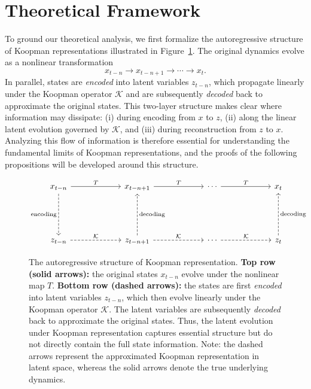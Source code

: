 \documentclass{article} %
\begin{document}
\section{Theoretical Framework} \label{append:theoretical_analysis}
To ground our theoretical analysis, we first formalize the autoregressive structure of Koopman representations illustrated in Figure~\ref{fig:latent_autoregressive_via_koopman}. The original dynamics evolve as a nonlinear transformation 
\[
x_{t-n} \to x_{t-n+1} \to \cdots \to x_t .
\] 
In parallel, states are \emph{encoded} into latent variables $z_{t-n}$, which propagate linearly under the Koopman operator $\mathcal{K}$ and are subsequently \emph{decoded} back to approximate the original states. This two-layer structure makes clear where information may dissipate: (i) during encoding from $x$ to $z$, (ii) along the linear latent evolution governed by $\mathcal{K}$, and (iii) during reconstruction from $z$ to $x$. Analyzing this flow of information is therefore essential for understanding the fundamental limits of Koopman representations, and the proofs of the following propositions will be developed around this structure.


\begin{figure}[h]
    \centering
    \[
    \begin{tikzcd}[row sep=5em, column sep=6em]
    x_{t-n} 
      \arrow[r, "T"] 
      \arrow[d, dashed, "\text{encoding}"'] 
      & x_{t-n+1} 
        \arrow[r, "T"] 
      & \cdots 
        \arrow[r, "T"] 
      & x_t 
    \\
    z_{t-n} 
      \arrow[r, dashed, "\mathcal{K}"] 
      & z_{t-n+1} 
        \arrow[r, dashed, "\mathcal{K}"] 
        \arrow[u, dashed, "\text{decoding}"'] 
      & \cdots 
        \arrow[r, dashed, "\mathcal{K}"]
      & z_t 
          \arrow[u, dashed, "\text{decoding}"'] 
    \end{tikzcd}
    \]
    \caption{
    The autoregressive structure of Koopman representation.
    \textbf{Top row (solid arrows):} the original states $x_{t-n}$ evolve under the nonlinear map $T$. 
    \textbf{Bottom row (dashed arrows):} the states are first \emph{encoded} into latent variables $z_{t-n}$, which then evolve linearly under the Koopman operator $\mathcal{K}$. 
    The latent variables are subsequently \emph{decoded} back to approximate the original states. 
    Thus, the latent evolution under Koopman representation captures essential structure but do not directly contain the full state information. Note: the dashed arrows represent the approximated Koopman representation in latent space, whereas the solid arrows denote the true underlying dynamics.}
    
    \label{fig:latent_autoregressive_via_koopman}
\end{figure}
\end{document}
